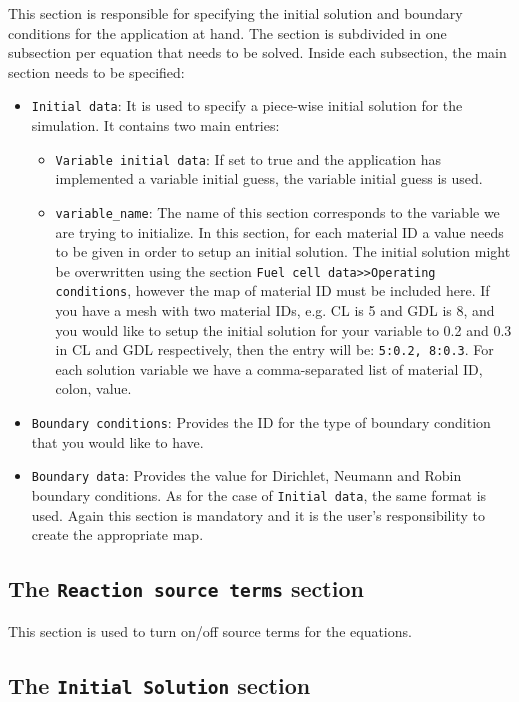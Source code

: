This section is responsible for specifying the initial solution and boundary conditions for the application at hand. The section is subdivided in one subsection per equation that needs to be solved. Inside each subsection, the main section needs to be specified:
\begin{itemize}
 \item \texttt{Initial data}: It is used to specify a piece-wise initial solution for the simulation. It contains two main entries:
 \begin{itemize}
  \item \texttt{Variable initial data}: If set to true and the application has implemented a variable initial guess, the variable initial guess is used.
  \item \texttt{variable\_name}: The name of this section corresponds to the variable we are trying to initialize. In this section, for each material ID a value needs to be given in order to setup an initial solution. The initial solution might be overwritten using the section \texttt{Fuel cell data>>Operating conditions}, however the map of material ID must be included here. If you have a mesh with two material IDs, e.g. CL is 5 and GDL is 8, and you would like to setup the initial solution for your variable to 0.2 and 0.3 in CL and GDL respectively, then the entry will be: \texttt{5:0.2, 8:0.3}. For each solution variable we have a comma-separated list of material ID, colon, value. 
 \end{itemize}
 \item \texttt{Boundary conditions}: Provides the ID for the type of boundary condition that you would like to have.
 \item \texttt{Boundary data}: Provides the value for Dirichlet, Neumann and Robin boundary conditions. As for the case of \texttt{Initial data}, the same format is used. Again this section is mandatory and it is the user's responsibility to create the appropriate map.
\end{itemize}

\subsection{The \texttt{Reaction source terms} section}
This section is used to turn on/off source terms for the equations.

\subsection{The \texttt{Initial Solution} section}

